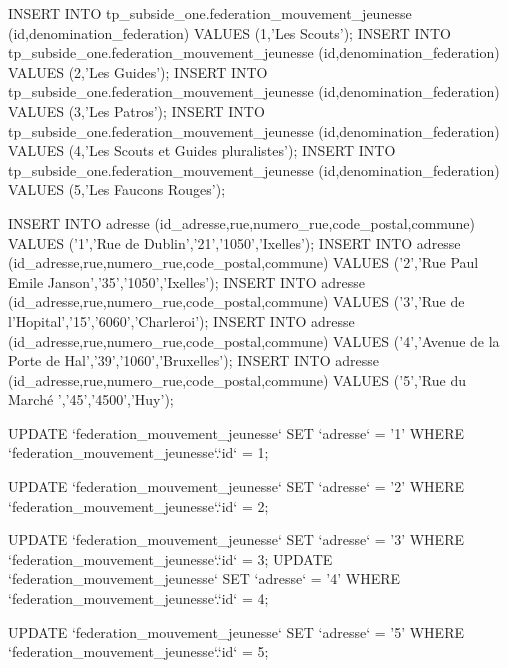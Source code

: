 INSERT INTO tp_subside_one.federation_mouvement_jeunesse (id,denomination_federation)
	VALUES (1,'Les Scouts');
INSERT INTO tp_subside_one.federation_mouvement_jeunesse (id,denomination_federation)
	VALUES (2,'Les Guides');
INSERT INTO tp_subside_one.federation_mouvement_jeunesse (id,denomination_federation)
	VALUES (3,'Les Patros');
INSERT INTO tp_subside_one.federation_mouvement_jeunesse (id,denomination_federation)
	VALUES (4,'Les Scouts et Guides pluralistes');
INSERT INTO tp_subside_one.federation_mouvement_jeunesse (id,denomination_federation)
	VALUES (5,'Les Faucons Rouges');
	
	
INSERT INTO adresse (id_adresse,rue,numero_rue,code_postal,commune) VALUES ('1','Rue de Dublin','21','1050','Ixelles');
INSERT INTO adresse (id_adresse,rue,numero_rue,code_postal,commune) VALUES ('2','Rue Paul Emile Janson','35','1050','Ixelles');
INSERT INTO adresse (id_adresse,rue,numero_rue,code_postal,commune) VALUES ('3','Rue de l'Hopital','15','6060','Charleroi');
INSERT INTO adresse (id_adresse,rue,numero_rue,code_postal,commune) VALUES ('4','Avenue de la Porte de Hal','39','1060','Bruxelles');
INSERT INTO adresse (id_adresse,rue,numero_rue,code_postal,commune) VALUES ('5','Rue du Marché ','45','4500','Huy');

UPDATE `federation_mouvement_jeunesse` SET `adresse` = '1' WHERE `federation_mouvement_jeunesse`.`id` = 1; 

UPDATE `federation_mouvement_jeunesse` SET `adresse` = '2' WHERE `federation_mouvement_jeunesse`.`id` = 2; 

UPDATE `federation_mouvement_jeunesse` SET `adresse` = '3' WHERE `federation_mouvement_jeunesse`.`id` = 3;
UPDATE `federation_mouvement_jeunesse` SET `adresse` = '4' WHERE `federation_mouvement_jeunesse`.`id` = 4; 

UPDATE `federation_mouvement_jeunesse` SET `adresse` = '5' WHERE `federation_mouvement_jeunesse`.`id` = 5; 
